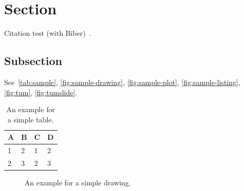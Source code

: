 \section{Section}
Citation test (with Biber)~\parencite{latex}.

\subsection{Subsection}

See~\autoref{tab:sample}, \autoref{fig:sample-drawing}, \autoref{fig:sample-plot}, \autoref{fig:sample-listing}, \autoref{fig:tum}, \autoref{fig:tumslide}.

\begin{table}[htpb]
  \caption[Example table]{An example for a simple table.}\label{tab:sample}
  \centering
  \begin{tabular}{l l l l}
    \toprule
      A & B & C & D \\
    \midrule
      1 & 2 & 1 & 2 \\
      2 & 3 & 2 & 3 \\
    \bottomrule
  \end{tabular}
\end{table}

\begin{figure}[htpb]
  \centering
  \caption[Example drawing]{An example for a simple drawing.}\label{fig:sample-drawing}
\end{figure}

